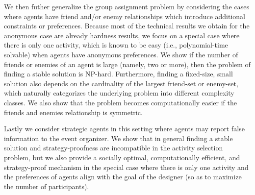 We then futher generalize the group assignment problem by considering the cases where agents have friend and/or enemy relationships which introduce additional constraints or preferences. Because most of the technical results we obtain for the anonymous case are already hardness results, we focus on a special case where there is only one activity, which is known to be easy (i.e., polynomial-time solvable) when agents have anonymous preferences. We show if the number of friends or enemies of an agent is large (namely, two or more), then the problem of finding a stable solution is NP-hard. Furthermore, finding a fixed-size, small solution also depends on the cardinality of the largest friend-set or enemy-set, which naturally categorizes the underlying problem into different complexity classes. We also show that the problem becomes computationally easier if the friends and enemies relationship is symmetric.

Lastly we consider strategic agents in this setting where agents may report false information to the event organizer. We show that in general finding a stable solution and strategy-proofness are incompatible in the activity selection problem, but we also provide a socially optimal, computationally efficient, and strategy-proof mechanism in the special case where there is only one activity and the preferences of agents align with the goal of the designer (so as to maximize the number of participants).
